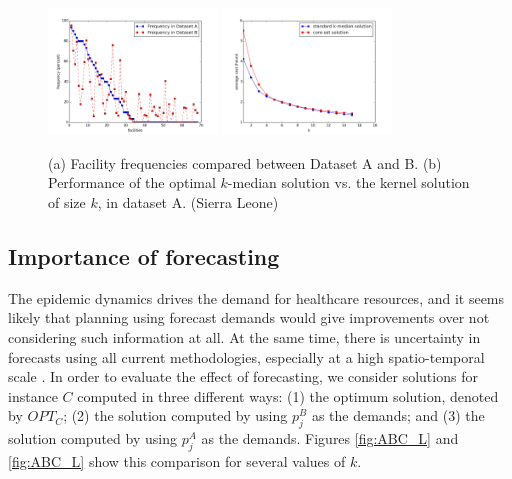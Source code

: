 \begin{figure}[h]
  \centering
    \includegraphics[width=0.4\textwidth]{figs/coreset_AB.png}
    \includegraphics[width=0.4\textwidth]{figs/core_only.png}
\caption{
(a) Facility frequencies compared between Dataset A and B.
(b) Performance of the optimal $k$-median solution vs. the kernel solution of size $k$, in dataset A. (Sierra Leone)
} 
        \label{fig:coreset_AB}
\end{figure}





\subsection*{Importance of forecasting}
The epidemic dynamics drives the demand for healthcare resources, and it seems
likely that planning using forecast demands would give improvements over not
considering such information at all. At the same time, there is uncertainty
in forecasts using all current methodologies, especially at a high
spatio-temporal scale \cite{chakraborty:sdm14}.
In order to evaluate the effect of forecasting,
we consider solutions for instance $C$ computed in three different
ways: (1) the optimum solution, denoted by $OPT_C$;
(2) the solution computed by using $p^B_j$ as the demands;
and (3) the solution computed by using $p^A_j$ as the demands.
Figures \ref{fig:ABC_L} and \ref{fig:ABC_L} show this comparison for several values of $k$.

